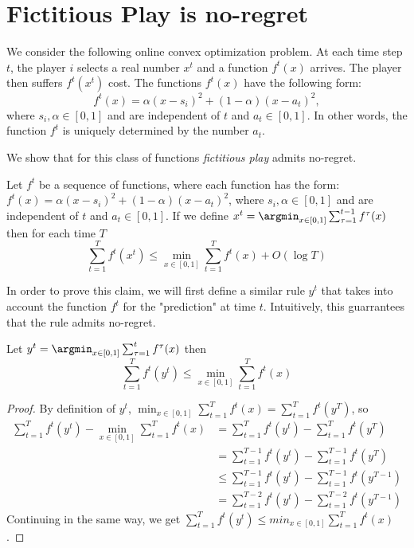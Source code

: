 \section{Fictitious Play is no-regret}\label{s:fictitious_noregret}

We consider the following online convex optimization problem.
At each time step $t$, the player $i$ selects a real number $x^t$ and a
function $f^t(x)$ arrives. The player then suffers $f^t(x^t)$ cost.
The functions $f^t(x)$ have the following form:
\[f^t(x) = \alpha(x-s_i)^2 + (1-\alpha)(x-a_t)^2,\]
where $s_i,\alpha \in [0,1]$ and are independent of $t$ and $a_t \in [0,1]$.
In other words, the function $f^t$ is uniquely determined by the number $a_t$.

We show that for this class of functions \emph{fictitious play} admits no-regret.
\begin{theorem}\label{t:no_regret}
  Let $f^t$ be a sequence of functions, where each function has the form:
  $f^t(x) = \alpha(x-s_i)^2 + (1-\alpha)(x-a_t)^2$,
  where $s_i,\alpha \in [0,1]$ and are independent of $t$ and
  $a_t \in [0,1]$.
  If we define $x^t = \argmin_{x \in [0,1]} \sum_{\tau = 1}^{t-1} f^\tau (x)$
  then for each time $T$
  \[
  \sum_{t = 1}^{T} f^t(x^t) \leq \min_{x \in [0,1]} \sum_{t=1}^T f^t(x) + O(\log  T)
  \]
\end{theorem}

In order to prove this claim, we will first define a similar rule $y^t$ that takes into account the function $f^t$
for the "prediction" at time $t$. Intuitively, this guarrantees that the rule admits no-regret.


\begin{lemma} Let $y^t = \argmin_{x \in [0,1]} \sum_{\tau = 1}^t f^\tau (x)$ then
  $$ \sum_{t=1}^T f^t(y^t) \leq \min_{x \in [0,1]} \sum_{t=1}^T f^t(x)$$
\end{lemma}
\begin{proof}By definition of $y^t$,
  $\min_{x \in [0,1]} \sum_{t=1}^T f^t(x) = \sum_{t=1}^T f^t(y^T)$, so
  \begin{align*}
    \sum_{t=1}^T f^t(y^t) - \min_{x \in [0,1]} \sum_{t=1}^T f^t(x) &=
    \sum_{t=1}^T f^t(y^t) - \sum_{t=1}^T f^t(y^T)\\
    &= \sum_{t=1}^{T-1} f^t(y^t) - \sum_{t=1}^{T-1} f^t(y^T)\\
    &\leq \sum_{t=1}^{T-1} f^t(y^t) - \sum_{t=1}^{T-1} f^t(y^{T-1})\\
    &= \sum_{t=1}^{T-2} f^t(y^t) - \sum_{t=1}^{T-2} f^t(y^{T-1})
  \end{align*}
  Continuing in the same way, we get
  $\sum_{t=1}^T f^t(y^t) \leq min_{x \in [0,1]} \sum_{t=1}^T f^t(x)$.
\end{proof}

